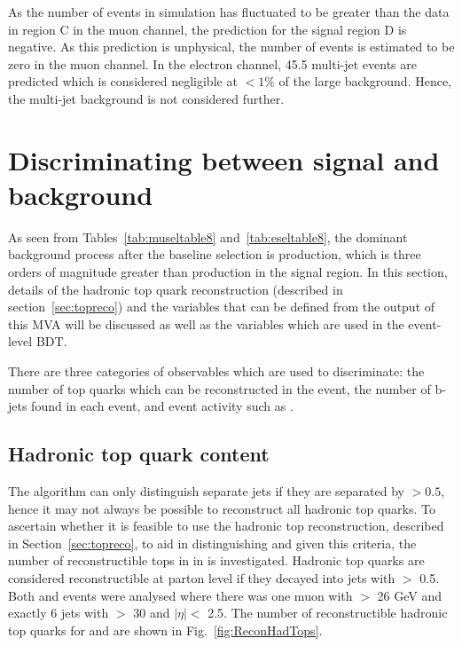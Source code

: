 As the number of \ttbar events in simulation has fluctuated to be greater than the data in region C in the muon channel, the prediction for the signal region D is negative. As this prediction is unphysical, the number of events is estimated to be zero in the muon channel. In the electron channel, 45.5 multi-jet events are predicted which is considered negligible at $<1\%$ of the large \ttbar background. Hence, the multi-jet background is not considered further.

\section{Discriminating between signal and background}
\label{sec:discriminating}
As seen from Tables~\ref{tab:museltable8} and~\ref{tab:eseltable8}, the dominant background process after the baseline selection is \ttbar production, which is three orders of magnitude greater than \tttt production in the signal region.
In this section, details of the hadronic top quark reconstruction (described in section~\ref{sec:topreco}) and the variables that can be defined from the output of this MVA will be discussed as well as the variables which are used in the event-level BDT.

There are three categories of observables which are used to discriminate: the number of top quarks which can be reconstructed in the event, the number of b-jets found in each event, and event activity such as \HT.

\subsection{Hadronic top quark content}
\label{sec:topContent}

The \antikt algorithm can only distinguish separate jets if they are separated by \DR$>0.5$, hence it may not always be possible to reconstruct all hadronic top quarks. To ascertain whether it is feasible to use the hadronic top reconstruction, described in Section~\ref{sec:topreco}, to aid in distinguishing \tttt and \ttbar given this criteria, the number of reconstructible tops in \tttt in \ttbar is investigated. Hadronic top quarks are considered reconstructible at parton level if they decayed into jets with \DR  $>$  0.5. Both \tttt and \ttbar events were analysed where there was one muon with \PT $>$ 26 GeV and exactly 6 jets with \PT $>$ 30 and $\lvert \eta \rvert<$ 2.5.  The number of reconstructible hadronic top quarks for \tttt and \ttbar are shown in Fig.~\ref{fig:ReconHadTops}.

